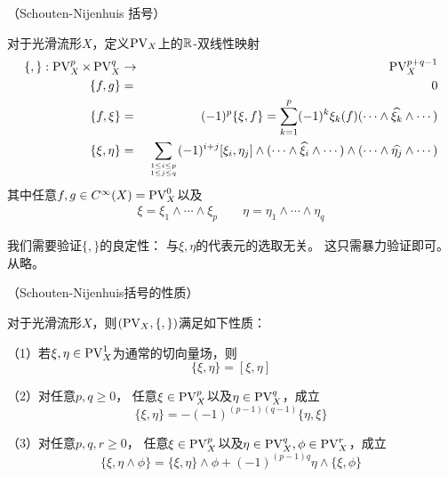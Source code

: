 \begin{definition}（Schouten-Nijenhuis 括号）
\label{Schouten-Nijenhuis定义-def}

对于光滑流形$X$，定义$\operatorname{PV}_X$上的$\mathbb{R}$-双线性映射
\begin{eqnarray*}
\{,\}:\operatorname{PV}^p_X\times \operatorname{PV}^q_X &\to& \operatorname{PV}^{p+q-1}_X\\
\{f,g\}     &=&0\\
\{f,\xi\}   &=&   (-1)^{p}\{\xi,f\}=
                  \sum_{k=1}^p(-1)^{k}
                  \xi_k(f)(\cdots\wedge\widehat{\xi_k}
                  \wedge\cdots)\\
\{\xi,\eta\}&=& \sum_{1\leq i\leq p\atop 1\leq j\leq q}(-1)^{i+j}
                  [\xi_i,\eta_j]\wedge
                  (\cdots\wedge\widehat{\xi_i}
                  \wedge\cdots)
                  \wedge(\cdots\wedge\widehat{\eta_j}
                  \wedge\cdots)
\end{eqnarray*}
其中任意$f,g\in C^{\infty}(X)=\operatorname{PV}^0_X$以及
\begin{eqnarray*}
\xi=\xi_1\wedge\cdots\wedge\xi_p\quad\quad
\eta=\eta_1\wedge\cdots\wedge\eta_q
\end{eqnarray*}
\end{definition}
我们需要验证$\{,\}$的良定性：
与$\xi,\eta$的代表元的选取无关。
这只需暴力验证即可。从略。

\begin{prop}（Schouten-Nijenhuis括号的性质）

对于光滑流形$X$，则$(\operatorname{PV}_X,\{,\})$满足如下性质：

（1）若$\xi,\eta\in\operatorname{PV}^1_X$为通常的切向量场，则
$$\{\xi,\eta\}=[\xi,\eta]$$

（2）对任意$p,q\geq 0$，
任意$\xi\in\operatorname{PV}^p_X$以及$\eta\in\operatorname{PV}_X^q$，成立
$$\{\xi,\eta\}=-(-1)^{(p-1)(q-1)}\{\eta,\xi\}$$

（3）对任意$p,q,r\geq 0$，
任意$\xi\in\operatorname{PV}^p_X$以及$\eta\in\operatorname{PV}_X^q,\phi\in\operatorname{PV}_X^r$，成立
$$\{\xi,\eta\wedge\phi\}=\{\xi,\eta\}\wedge\phi
+(-1)^{(p-1)q}\eta\wedge\{\xi,\phi\}$$
\label{Schouten-Nijenhuis公理-prop}
\end{prop}




